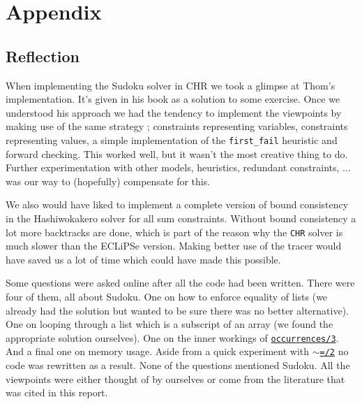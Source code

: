 \section*{Appendix}
\label{sec:appendix}

\subsection*{Reflection}\label{sec:reflection}

When implementing the Sudoku solver in CHR we took a glimpse at Thom's implementation. It's given in his book as a solution to some exercise. Once we understood his approach we had the tendency to implement the viewpoints by making use of the same strategy ; constraints representing variables, constraints representing values, a simple implementation of the \texttt{first\_fail} heuristic and forward checking. This worked well, but it wasn't the most creative thing to do. Further experimentation with other models, heuristics, redundant constraints, ... was our way to (hopefully) compensate for this.\\\par

We also would have liked to implement a complete version of bound consistency in the Hashiwokakero solver for all sum constraints. Without bound consistency a lot more backtracks are done, which is part of the reason why the \texttt{CHR} solver is much slower than the ECLiPSe version. Making better use of the tracer would have saved us a lot of time which could have made this possible.\\\par

Some questions were asked online after all the code had been written. There were four of them, all about Sudoku. One on how to enforce equality of lists (we already had the solution but wanted to be sure there was no better alternative). One on looping through a list which is a subscript of an array (we found the appropriate solution ourselves). One on the inner workings of \href{http://eclipseclp.org/doc/bips/lib/ic_global/occurrences-3.html}{\texttt{occurrences/3}}. And a final one on memory usage. Aside from a quick experiment with \href{https://eclipseclp.org/doc/bips/kernel/termcomp/TE-2.html}{\texttt{$\sim$=/2}} no code was rewritten as a result. None of the questions mentioned Sudoku. All the viewpoints were either thought of by ourselves or come from the literature that was cited in this report.

